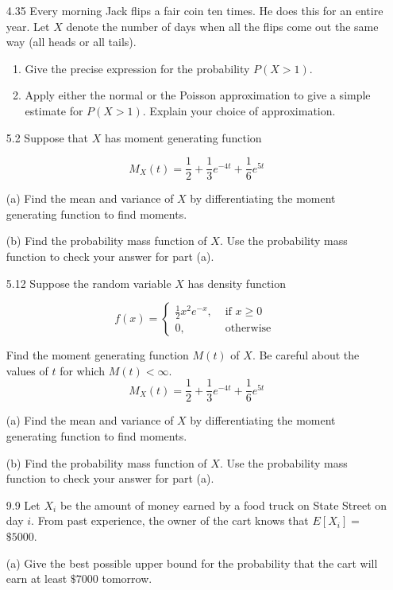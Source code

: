 \documentclass[10pt]{article}
\begin{document}
\begin{itemize}
\newpage
  \item[4.35]  Every morning Jack flips a fair coin ten times. He does this for an entire year. Let $X$ denote the number of days when all the flips come out the same way (all heads or all tails).

    \begin{enumerate}
      \item  Give the precise expression for the probability $P(X>1)$.

      \item  Apply either the normal or the Poisson approximation to give a simple estimate for $P(X>1)$. Explain your choice of approximation.
    \end{enumerate}

\newpage
  \item[5.2]  Suppose that $X$ has moment generating function

$$
M_{X}(t)=\frac{1}{2}+\frac{1}{3} e^{-4 t}+\frac{1}{6} e^{5 t}
$$

(a) Find the mean and variance of $X$ by differentiating the moment generating function to find moments.

(b) Find the probability mass function of $X$. Use the probability mass function to check your answer for part (a).
\newpage
  \item[5.12]  Suppose the random variable $X$ has density function

$$
f(x)= \begin{cases}\frac{1}{2} x^{2} e^{-x}, & \text { if } x \geq 0 \\ 0, & \text { otherwise }\end{cases}
$$

Find the moment generating function $M(t)$ of $X$. Be careful about the values of $t$ for which $M(t)<\infty$.
$$
M_{X}(t)=\frac{1}{2}+\frac{1}{3} e^{-4 t}+\frac{1}{6} e^{5 t}
$$

(a) Find the mean and variance of $X$ by differentiating the moment generating function to find moments.

(b) Find the probability mass function of $X$. Use the probability mass function to check your answer for part (a).

\newpage
  \item[9.9]  Let $X_{i}$ be the amount of money earned by a food truck on State Street on day $i$. From past experience, the owner of the cart knows that $E\left[X_{i}\right]=$ $\$ 5000$.

(a) Give the best possible upper bound for the probability that the cart will earn at least $\$ 7000$ tomorrow.


\end{itemize}
\end{document}
